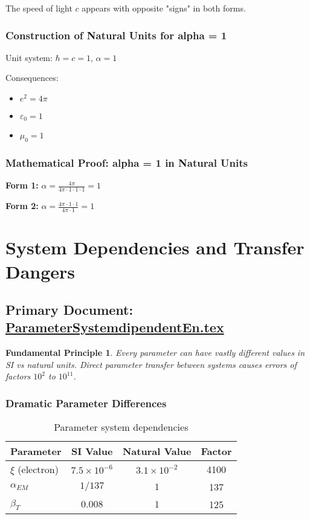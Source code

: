 \documentclass[12pt,a4paper]{report}
\newtheorem{principle}{Fundamental Principle}[chapter]
\begin{document}
	The speed of light $c$ appears with opposite "signs" in both forms.
	
	\subsubsection{Construction of Natural Units for alpha = 1}
	Unit system: $\hbar = c = 1$, $\alpha = 1$
	
	Consequences:
	\begin{itemize}
		\item $e^2 = 4\pi$
		\item $\varepsilon_0 = 1$
		\item $\mu_0 = 1$
	\end{itemize}
	
	\subsubsection{Mathematical Proof: alpha = 1 in Natural Units}
	\textbf{Form 1:} $\alpha = \frac{4\pi}{4\pi \cdot 1 \cdot 1 \cdot 1} = 1$ \checkmark
	
	\textbf{Form 2:} $\alpha = \frac{4\pi \cdot 1 \cdot 1}{4\pi \cdot 1} = 1$ \checkmark
	
	\section{System Dependencies and Transfer Dangers}
	\subsection{Primary Document: \href{https://github.com/jpascher/T0-Time-Mass-Duality/tree/main/2/pdf/ParameterSystemdipendentEn.pdf}{ParameterSystemdipendentEn.tex}}
	
	\begin{principle}
		Every parameter can have vastly different values in SI vs natural units. Direct parameter transfer between systems causes errors of factors $10^2$ to $10^{11}$.
	\end{principle}
	
	\subsubsection{Dramatic Parameter Differences}
	\begin{table}[H]
		\centering
		\begin{tabular}{lccc}
			\toprule
			\textbf{Parameter} & \textbf{SI Value} & \textbf{Natural Value} & \textbf{Factor} \\
			\midrule
			$\xi$ (electron) & $7.5 \times 10^{-6}$ & $3.1 \times 10^{-2}$ & 4100 \\
			$\alpha_{EM}$ & $1/137$ & $1$ & 137 \\
			$\beta_T$ & $0.008$ & $1$ & 125 \\
			\bottomrule
		\end{tabular}
		\caption{Parameter system dependencies}
		\label{tab:parameter-systems}
	\end{table}
	
\end{document}
